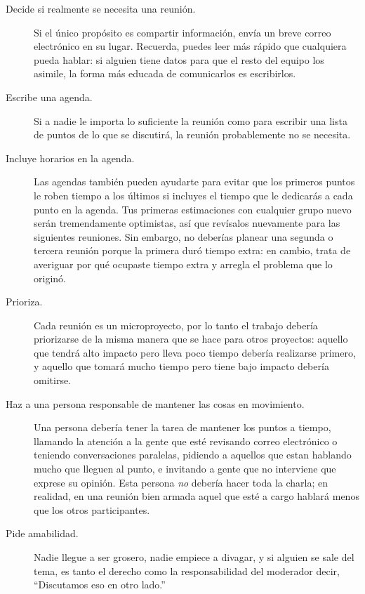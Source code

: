 \begin{description}

\item[Decide si realmente se necesita una reunión.]
  Si el único propósito es compartir información,
  envía un breve correo electrónico en su lugar.
  Recuerda,
  puedes leer más rápido que cualquiera pueda hablar:
  si alguien tiene datos para que el resto del equipo los asimile,
  la forma más educada de comunicarlos es escribirlos.

\item[Escribe una agenda.]
  Si a nadie le importa lo suficiente la reunión como para escribir una lista de puntos
  de lo que se discutirá,
  la reunión probablemente no se necesita.

\item[Incluye horarios en la agenda.]
  Las agendas también pueden ayudarte para evitar que los primeros puntos le roben tiempo a los últimos
  si incluyes el tiempo que le dedicarás a cada punto en la agenda.
  Tus primeras estimaciones con cualquier grupo nuevo serán tremendamente optimistas,
  así que revísalos nuevamente para las siguientes reuniones.
  Sin embargo,
  no deberías planear una segunda o tercera reunión
  porque la primera duró tiempo extra:
  en cambio,
  trata de averiguar por qué ocupaste tiempo extra y arregla el problema que lo originó. 

\item[Prioriza.]
  Cada reunión es un microproyecto,
  por lo tanto el trabajo debería priorizarse de la misma manera que se hace para otros proyectos:
  aquello que tendrá alto impacto pero lleva poco tiempo debería realizarse primero,
  y aquello que tomará mucho tiempo pero tiene bajo impacto debería omitirse.

\item[Haz a una persona responsable de mantener las cosas en movimiento.]
  Una persona debería tener la tarea de mantener los puntos a tiempo,
  llamando la atención a la gente que esté revisando correo electrónico o  teniendo  conversaciones paralelas,
  pidiendo a aquellos que estan hablando mucho que lleguen al punto,
  e invitando a gente que no interviene que exprese su opinión.
  Esta persona \emph{no} debería hacer toda la charla;
  en realidad, 
  en una reunión bien armada aquel que esté a cargo hablará menos 
  que los otros participantes.

\item[Pide amabilidad.]
  Nadie llegue a ser grosero,
  nadie empiece a divagar,
  y si alguien se sale del tema,
  es tanto el derecho como la responsabilidad del moderador decir,
  ``Discutamos eso en otro lado.''


\end{description}
